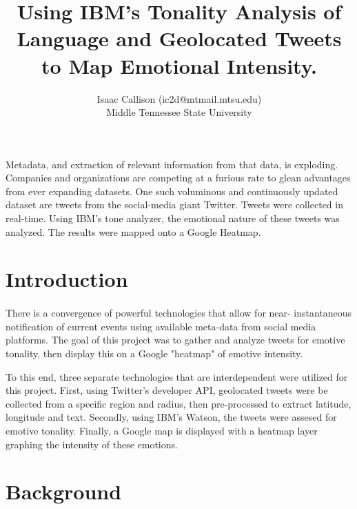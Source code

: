 \documentclass[12pt, oneside]{article}
\title{Using IBM's Tonality Analysis of Language and Geolocated Tweets to Map Emotional Intensity.
\\\medskip}
\author{Isaac Callison (ic2d@mtmail.mtsu.edu)\\Middle Tennessee State University}
\begin{document}
\maketitle
\nocite{*}
\newpage{}


\renewenvironment{abstract}
 {\small
  \begin{center}
  \bfseries \abstractname\vspace{-.5em}\vspace{0pt}
  \end{center}
  \list{}{
    \setlength{\leftmargin}{.8cm}%
    \setlength{\rightmargin}{\leftmargin}%
  }%
  \item\relax}
 {\endlist}

\begin{abstract}
Metadata, and extraction of relevant information from that data, is exploding.
Companies and organizations are competing at a furious rate to glean advantages
from ever expanding datasets. One such voluminous and continuously updated
dataset are tweets from the social-media giant Twitter. Tweets were collected
in real-time. Using IBM's tone analyzer, the emotional nature of these tweets
was analyzed. The results were mapped onto a Google Heatmap.
\end{abstract}



\section{Introduction}
\paragraph{}
There is a convergence of powerful technologies that allow for near-
instantaneous notification of current events using available meta-data from
social media platforms. The goal of this project was to gather and analyze
tweets for emotive tonality, then display this on a Google "heatmap" of emotive
intensity.

To this end, three separate technologies that are interdependent were utilized
for this project. First, using Twitter's developer API, geolocated tweets were be collected from a specific region and radius, then pre-processed to extract
latitude, longitude and text. Secondly, using IBM's Watson, the tweets were
assesed for emotive tonality. Finally, a Google map is displayed with a
heatmap layer graphing the intensity of these emotions.


\section{Background}
\end{document}

